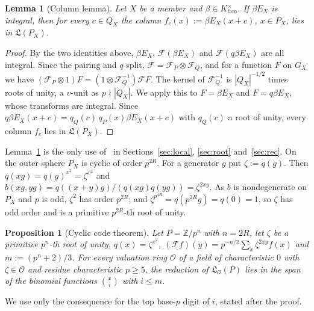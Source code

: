 \documentclass[11pt]{amsart}
\numberwithin{equation}{section}
\theoremstyle{plain}
\newtheorem{proposition}[theorem]{Proposition}
\newtheorem{lemma}[theorem]{Lemma}
\theoremstyle{definition}
\theoremstyle{remark}
\begin{document}
\begin{lemma}[Column lemma]\label{lem:column}
Let \(X\) be a member and \(\beta\in K_{\mathrm{fam}}^\times\). If \(\beta E_X\) is integral, then for every \(c\in Q_X\) the \emph{column} \(f_c(x):=\beta E_X(x+c)\), \(x\in P_X\), lies in \(\mathfrak L(P_X)\).
\end{lemma}

\begin{proof}
By the two identities above, \(\beta E_X\), \(\mathcal F(\beta E_X)\) and \(\mathcal F(q\beta E_X)\) are all integral. Since the pairing and \(q\) split, \(\mathcal F=\mathcal F_P\otimes\mathcal F_Q\), and for a function \(F\) on \(G_X\) we have \((\mathcal F_P\otimes1)F=(1\otimes\mathcal F_Q^{-1})\mathcal FF\). The kernel of \(\mathcal F_Q^{-1}\) is \(|Q_X|^{-1/2}\) times roots of unity, a \(v\)-unit as \(p\nmid|Q_X|\). We apply this to \(F=\beta E_X\) and \(F=q\beta E_X\), whose transforms are integral. Since \(q\beta E_X(x+c)=q_{Q}(c)\,q_P(x)\beta E_X(x+c)\) with \(q_Q(c)\) a root of unity, every column \(f_c\) lies in \(\mathfrak L(P_X)\).
\end{proof}

Lemma~\ref{lem:column} is the only use of~\cite[(6)]{RW} in Sections~\ref{sec:local}, \ref{sec:root} and~\ref{sec:rec}. On the outer sphere \(P_X\) is cyclic of order \(p^{2R}\). For a generator \(g\) put \(\zeta:=q(g)\). Then \(q(xg)=q(g)^{x^2}=\zeta^{x^2}\) and \(b(xg,yg)=q((x+y)g)/(q(xg)q(yg))=\zeta^{2xy}\). As \(b\) is nondegenerate on \(P_X\) and \(p\) is odd, \(\zeta^2\) has order \(p^{2R}\); and \(\zeta^{p^{4R}}=q(p^{2R}g)=q(0)=1\), so \(\zeta\) has odd order and is a primitive \(p^{2R}\)-th root of unity.

\begin{proposition}[Cyclic code theorem]\label{prop:code}
Let \(P=\mathbb Z/p^{n}\) with \(n=2R\), let \(\zeta\) be a primitive \(p^n\)-th root of unity, \(q(x)=\zeta^{x^2}\), \((\mathcal Ff)(y)=p^{-n/2}\sum_x\zeta^{2xy}f(x)\) and \(m:=(p^n+2)/3\). For every valuation ring \(\mathcal O\) of a field of characteristic \(0\) with \(\zeta\in\mathcal O\) and residue characteristic \(p\ge5\), the reduction of \(\mathfrak L_{\mathcal O}(P)\) lies in the span of the binomial functions \(\binom{x}{i}\) with \(i\le m\).
\end{proposition}

We use only the consequence for the top base-\(p\) digit of \(i\), stated after the proof.
\end{document}
